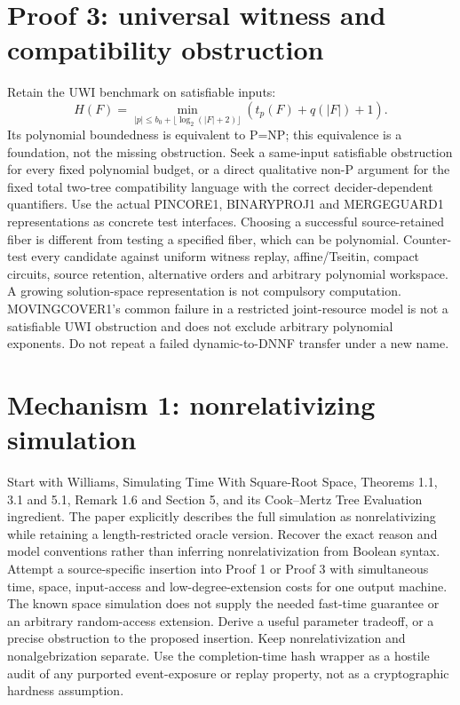\documentclass[11pt]{article}
\begin{document}
\section{Proof 3: universal witness and compatibility obstruction}
Retain the UWI benchmark on satisfiable inputs:
\[
 H(F)=\min_{|p|\le b_0+\lfloor\log_2(|F|+2)\rfloor}(t_p(F)+q(|F|)+1).
\]
Its polynomial boundedness is equivalent to P=NP; this equivalence is a foundation, not the missing obstruction. Seek a same-input satisfiable obstruction for every fixed polynomial budget, or a direct qualitative non-P argument for the fixed total two-tree compatibility language with the correct decider-dependent quantifiers. Use the actual PINCORE1, BINARYPROJ1 and MERGEGUARD1 representations as concrete test interfaces. Choosing a successful source-retained fiber is different from testing a specified fiber, which can be polynomial.
Counter-test every candidate against uniform witness replay, affine/Tseitin, compact circuits, source retention, alternative orders and arbitrary polynomial workspace. A growing solution-space representation is not compulsory computation. MOVINGCOVER1's common failure in a restricted joint-resource model is not a satisfiable UWI obstruction and does not exclude arbitrary polynomial exponents. Do not repeat a failed dynamic-to-DNNF transfer under a new name.

\section{Mechanism 1: nonrelativizing simulation}
Start with Williams, Simulating Time With Square-Root Space, Theorems 1.1, 3.1 and 5.1, Remark 1.6 and Section 5, and its Cook--Mertz Tree Evaluation ingredient. The paper explicitly describes the full simulation as nonrelativizing while retaining a length-restricted oracle version. Recover the exact reason and model conventions rather than inferring nonrelativization from Boolean syntax.
Attempt a source-specific insertion into Proof 1 or Proof 3 with simultaneous time, space, input-access and low-degree-extension costs for one output machine. The known space simulation does not supply the needed fast-time guarantee or an arbitrary random-access extension. Derive a useful parameter tradeoff, or a precise obstruction to the proposed insertion. Keep nonrelativization and nonalgebrization separate. Use the completion-time hash wrapper as a hostile audit of any purported event-exposure or replay property, not as a cryptographic hardness assumption.
\end{document}

